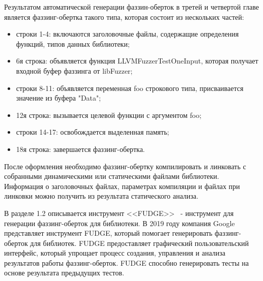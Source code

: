 Результатом автоматической генерации фаззин-оберток в третей и четвертой главе является фаззинг-обертка такого типа, которая состоит из нескольких частей:
\begin{itemize}
    \item строки 1-4: включаются заголовочные файлы, содержащие определения функций, типов данных библиотеки;
    \item 6я строка: объявляется функция LLVMFuzzerTestOneInput, которая получает входной буфер фаззинга от libFuzzer;
    \item строки 8-11: объявляется переменная foo строкового типа, присваивается значение из буфера "Data";
    \item 12я строка: вызывается целевой функции с аргументом foo;
    \item строки 14-17: освобождается выделенная память;
    \item 18я строка: завершается фаззинг-обертка.
\end{itemize}

После оформления необходимо фаззинг-обертку  компилировать и линковать  с собранными динамическими или статическими файлами библиотеки. Информация о заголовочных файлах, параметрах компиляции и файлах при линковки можно получить из результата статического анализа. 

В разделе 1.2 описывается инструмент <<FUDGE>>~\autocite{48314} - инструмент для генерации фаззинг-оберток для библиотеки. В 2019 году компания Google представляет инструмент FUDGE, который помогает генерировать фаззинг-оберток для библиотек. FUDGE предоставляет графический пользовательский интерфейс, который упрощает процесс создания, управления и анализа результатов работы фаззинг-оберток. FUDGE способно генерировать тесты на основе результата предыдущих тестов.

